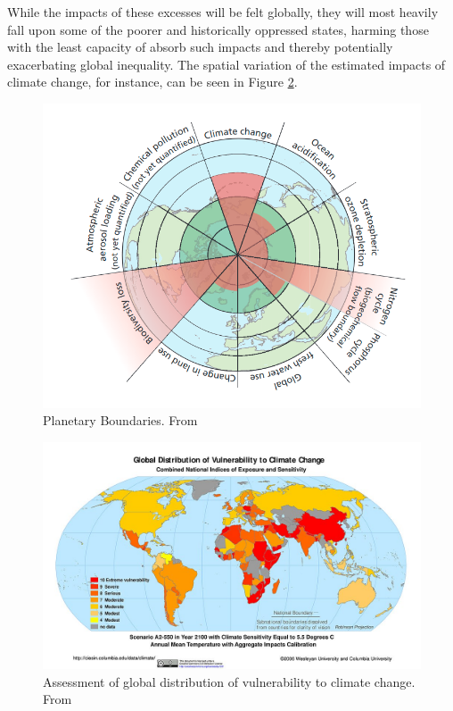 While the impacts of these excesses will be felt globally, they will most heavily fall upon some of the poorer and historically oppressed states, harming those with the least capacity of absorb such impacts and thereby potentially exacerbating global inequality. The spatial variation of the estimated impacts of climate change, for instance, can be seen in Figure \ref{fig:vulnerability}.

\begin{figure}[H]
	\centering
	\includegraphics[scale=0.35]{Figures/chap2/Planetary_Boundaries.png}
	\caption[Planetary Boundaries]{Planetary Boundaries. From \cite{rockstromSafeOperatingSpace2009}}
	\label{fig:boundaries}
\end{figure}


\begin{figure}[H]
	\centering
	\includegraphics[scale=1.7]{Figures/chap2/vulnerability_map.jpg}
	\caption[Assessment of global distribution of vulnerability to climate change]{Assessment of global distribution of vulnerability to climate change. From \cite{yoheSyntheticAssessmentGlobal2006}}
	\label{fig:vulnerability}
\end{figure}

